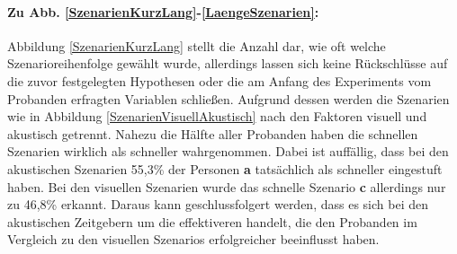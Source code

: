 \documentclass{Paper}
\begin{document}
\paragraph{Zu Abb. \ref{SzenarienKurzLang}-\ref{LaengeSzenarien}:} Abbildung \ref{SzenarienKurzLang} stellt die Anzahl dar, wie oft welche Szenarioreihenfolge gewählt wurde, allerdings lassen sich keine Rückschlüsse auf die zuvor festgelegten Hypothesen oder die am Anfang des Experiments vom Probanden erfragten Variablen schließen. Aufgrund dessen werden die Szenarien wie in Abbildung \ref{SzenarienVisuellAkustisch}
nach den Faktoren visuell und akustisch getrennt. Nahezu die Hälfte aller Probanden haben die schnellen Szenarien wirklich als schneller wahrgenommen. Dabei ist auffällig, dass bei den akustischen Szenarien 55,3\% der Personen \textbf{a} tatsächlich als schneller eingestuft haben. Bei den visuellen Szenarien wurde das schnelle Szenario \textbf{c} allerdings nur zu 46,8\% erkannt. Daraus kann geschlussfolgert werden, dass es sich bei den akustischen Zeitgebern um die effektiveren handelt, die den Probanden im Vergleich zu den visuellen Szenarios erfolgreicher beeinflusst haben.
\end{document}
